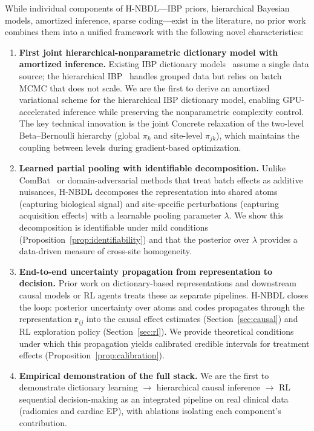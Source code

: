 \documentclass[11pt,a4paper]{article}
\theoremstyle{definition}
\begin{document}
While individual components of H-NBDL---IBP priors, hierarchical Bayesian models, amortized inference, sparse coding---exist in the literature, no prior work combines them into a unified framework with the following novel characteristics:
\begin{enumerate}[leftmargin=*,nosep]
  \item \textbf{First joint hierarchical-nonparametric dictionary model with amortized inference.} Existing IBP dictionary models~\citep{zhou2012,paisley2015} assume a single data source; the hierarchical IBP~\citep{thibaux2007} handles grouped data but relies on batch MCMC that does not scale. We are the first to derive an amortized variational scheme for the hierarchical IBP dictionary model, enabling GPU-accelerated inference while preserving the nonparametric complexity control. The key technical innovation is the joint Concrete relaxation of the two-level Beta--Bernoulli hierarchy (global $\pi_k$ and site-level $\pi_{jk}$), which maintains the coupling between levels during gradient-based optimization.
  \item \textbf{Learned partial pooling with identifiable decomposition.} Unlike ComBat~\citep{johnson2007} or domain-adversarial methods that treat batch effects as additive nuisances, H-NBDL decomposes the representation into shared atoms (capturing biological signal) and site-specific perturbations (capturing acquisition effects) with a learnable pooling parameter $\lambda$. We show this decomposition is identifiable under mild conditions (Proposition~\ref{prop:identifiability}) and that the posterior over $\lambda$ provides a data-driven measure of cross-site homogeneity.
  \item \textbf{End-to-end uncertainty propagation from representation to decision.} Prior work on dictionary-based representations and downstream causal models or RL agents treats these as separate pipelines. H-NBDL closes the loop: posterior uncertainty over atoms and codes propagates through the representation $\mathbf{r}_{ij}$ into the causal effect estimates (Section~\ref{sec:causal}) and RL exploration policy (Section~\ref{sec:rl}). We provide theoretical conditions under which this propagation yields calibrated credible intervals for treatment effects (Proposition~\ref{prop:calibration}).
  \item \textbf{Empirical demonstration of the full stack.} We are the first to demonstrate dictionary learning $\to$ hierarchical causal inference $\to$ RL sequential decision-making as an integrated pipeline on real clinical data (radiomics and cardiac EP), with ablations isolating each component's contribution.
\end{enumerate}
\end{document}
